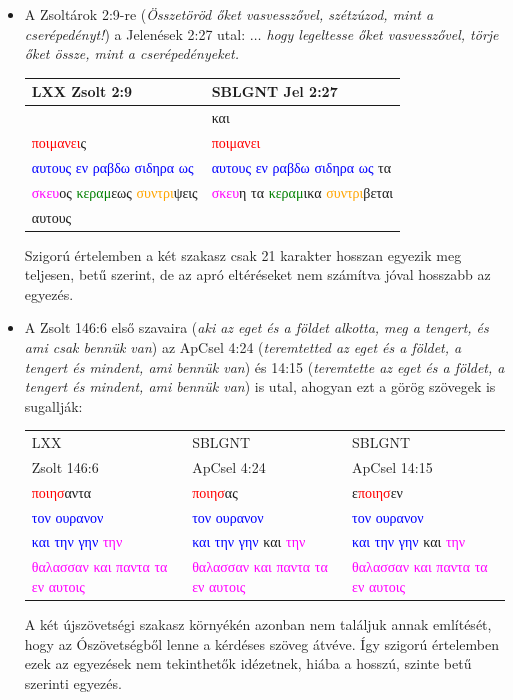 \documentclass{article}
\newcommand\gr{\selectlanguage{greek}\frenchspacing}
\newcommand\hu{\selectlanguage{magyar}\frenchspacing}
\begin{document}
\begin{itemize}
\item A Zsoltárok 2:9-re (\textit{Összetöröd őket vasvesszővel, szétzúzod, mint a cserépedényt!})
a Jelenések 2:27 utal: \textit{$\ldots$
hogy legeltesse őket vasvesszővel, törje őket össze, mint a cserépedényeket.}
\begin{center}
\begin{tabular}{p{5cm} p{5cm}}
LXX Zsolt 2:9 & SBLGNT Jel 2:27\\
\hline
& {\gr και}\\
{\gr \textcolor{red}{ποιμανει}ς } & 
{\gr \textcolor{red}{ποιμανει}}\\
{\gr \textcolor{blue}{αυτους εν ραβδω σιδηρα ως}}&
{\gr \textcolor{blue}{αυτους εν ραβδω σιδηρα ως} τα}\\
{\gr \textcolor{magenta}{σκευ}ος \textcolor{green}{κεραμ}εως \textcolor{orange}{συντρι}ψεις}
& {\gr \textcolor{magenta}{σκευ}η τα \textcolor{green}{κεραμ}ικα \textcolor{orange}{συντρι}βεται}\\
{\gr  αυτους}&
\end{tabular}
\end{center}
\hu
Szigorú értelemben a két szakasz csak 21 karakter hosszan egyezik meg teljesen, betű szerint,
de az apró eltéréseket nem számítva jóval hosszabb az egyezés.
\item A Zsolt 146:6 első szavaira (\textit{aki az eget és a földet alkotta, meg a tengert, és ami csak bennük van})
az ApCsel 4:24 (\textit{teremtetted az eget és a földet, a tengert és mindent, ami bennük van}) és 14:15 
(\textit{teremtette az eget és a földet, a tengert és mindent, ami bennük van}) is utal, ahogyan ezt
a görög szövegek is sugallják:
\begin{center}
\begin{tabular}{p{3.3cm} p{3.3cm} p{3.3cm}}
LXX & SBLGNT & SBLGNT\\
Zsolt 146:6 & ApCsel 4:24 & ApCsel 14:15\\
\hline
{\gr 
 \textcolor{red}{ποιησ}αντα} &
{\gr 
 \textcolor{red}{ποιησ}ας} &
{\gr 
 ε\textcolor{red}{ποιησ}εν}\\
{\gr \textcolor{blue}{τον ουρανον}}&
{\gr \textcolor{blue}{τον ουρανον}}&
{\gr \textcolor{blue}{τον ουρανον}}\\
{\gr \textcolor{blue}{και την γην} \textcolor{magenta}{την}} &
{\gr \textcolor{blue}{και την γην} και \textcolor{magenta}{την}} &
{\gr \textcolor{blue}{και την γην} και \textcolor{magenta}{την}}\\
{\gr \textcolor{magenta}{θαλασσαν και παντα τα εν αυτοις}}&
{\gr \textcolor{magenta}{θαλασσαν και παντα τα εν αυτοις}}&
{\gr \textcolor{magenta}{θαλασσαν και παντα τα εν αυτοις}}
\end{tabular}
\end{center}
\hu
A két újszövetségi szakasz környékén azonban nem találjuk annak említését, hogy az Ószövetségből
lenne a kérdéses szöveg átvéve. Így szigorú értelemben ezek az egyezések nem tekinthetők
idézetnek, hiába a hosszú, szinte betű szerinti egyezés.
\end{itemize}
\end{document}
